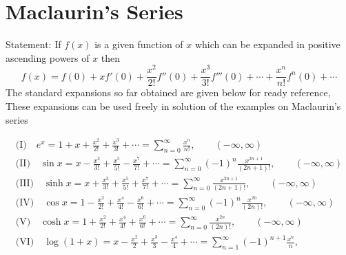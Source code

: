\documentclass[12pt]{article}
\begin{document}

\section*{Maclaurin's Series}

Statement: If $f(x)$ is a given function of $x$ which can be expanded in positive ascending
powers of $x$ then
\[
  f(x)=f(0)+xf'(0)+\frac{x^{2}}{2!}f''(0)+\frac{x^{3}}{3!}f'''(0)+\cdots+\frac{x^{n}}{n!}f^{n}(0)+\cdots
\]
The standard expansions so far obtained are given below for ready reference, These
expansions can be used freely in solution of the examples on Maclaurin's series

\begin{gather*}
  \text{(I)}\quad e^{x}=1+x+\frac{x^{2}}{2!}+\frac{x^{3}}{3!}+\cdots=\sum_{n=0}^{\infty}\frac{x^{n}}{n!},\qquad(-\infty,\infty)\\[0.8em]
  \text{(II)}\quad \sin x=x-\frac{x^{3}}{3!}+\frac{x^{5}}{5!}-\frac{x^{7}}{7!}+\cdots=\sum_{n=0}^{\infty}(-1)^{n}\frac{x^{2n+1}}{(2n+1)!},\qquad(-\infty,\infty)\\[0.8em]
  \text{(III)}\quad \sinh x=x+\frac{x^{3}}{3!}+\frac{x^{5}}{5!}+\frac{x^{7}}{7!}+\cdots=\sum_{n=0}^{\infty}\frac{x^{2n+1}}{(2n+1)!},\qquad(-\infty,\infty)\\[0.8em]
  \text{(IV)}\quad \cos x=1-\frac{x^{2}}{2!}+\frac{x^{4}}{4!}-\frac{x^{6}}{6!}+\cdots=\sum_{n=0}^{\infty}(-1)^{n}\frac{x^{2n}}{(2n)!},\qquad(-\infty,\infty)\\[0.8em]
  \text{(V)}\quad \cosh x=1+\frac{x^{2}}{2!}+\frac{x^{4}}{4!}+\frac{x^{6}}{6!}+\cdots=\sum_{n=0}^{\infty}\frac{x^{2n}}{(2n)!},\qquad(-\infty,\infty)\\[0.8em]
  \text{(VI)}\quad \log(1+x)=x-\frac{x^{2}}{2}+\frac{x^{3}}{3}-\frac{x^{4}}{4}+\cdots=\sum_{n=1}^{\infty}(-1)^{n+1}\frac{x^{n}}{n},
\end{gather*}
\end{document}
